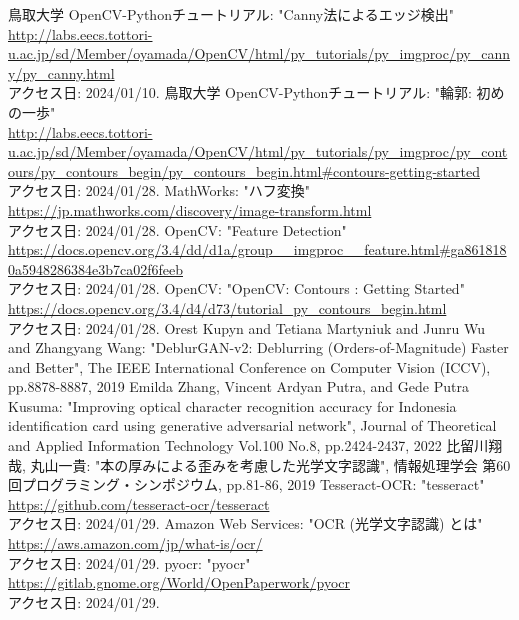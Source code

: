 \documentclass[uplatex, report, a4j, 10pt]{jsbook}
\begin{document}
\begin{thebibliography}{0}
  鳥取大学 OpenCV-Pythonチュートリアル: "Canny法によるエッジ検出"\\\url{http://labs.eecs.tottori-u.ac.jp/sd/Member/oyamada/OpenCV/html/py_tutorials/py_imgproc/py_canny/py_canny.html}\\アクセス日: 2024/01/10.
  鳥取大学 OpenCV-Pythonチュートリアル: "輪郭: 初めの一歩"\\\url{http://labs.eecs.tottori-u.ac.jp/sd/Member/oyamada/OpenCV/html/py_tutorials/py_imgproc/py_contours/py_contours_begin/py_contours_begin.html#contours-getting-started}\\アクセス日: 2024/01/28.
  MathWorks: "ハフ変換"\\\url{https://jp.mathworks.com/discovery/image-transform.html}\\アクセス日: 2024/01/28.
  OpenCV: "Feature Detection"\\\url{https://docs.opencv.org/3.4/dd/d1a/group__imgproc__feature.html#ga8618180a5948286384e3b7ca02f6feeb}\\アクセス日: 2024/01/28.
  OpenCV: "OpenCV: Contours : Getting Started"\\\url{https://docs.opencv.org/3.4/d4/d73/tutorial_py_contours_begin.html}\\アクセス日: 2024/01/28.
  Orest Kupyn and Tetiana Martyniuk and Junru Wu and Zhangyang Wang: "DeblurGAN-v2: Deblurring (Orders-of-Magnitude) Faster and Better", The IEEE International Conference on Computer Vision (ICCV), pp.8878-8887, 2019
  Emilda Zhang,  Vincent Ardyan Putra, and Gede Putra Kusuma: "Improving optical character recognition accuracy for Indonesia identification card using generative adversarial network", Journal of Theoretical and Applied Information Technology Vol.100 No.8, pp.2424-2437, 2022
  比留川翔哉, 丸山一貴: "本の厚みによる歪みを考慮した光学文字認識", 情報処理学会 第60回プログラミング・シンポジウム, pp.81-86, 2019
  Tesseract-OCR: "tesseract"\\\url{https://github.com/tesseract-ocr/tesseract}\\アクセス日: 2024/01/29.
  Amazon Web Services: "OCR (光学文字認識) とは"\\\url{https://aws.amazon.com/jp/what-is/ocr/}\\アクセス日: 2024/01/29.
  pyocr: "pyocr"\\\url{https://gitlab.gnome.org/World/OpenPaperwork/pyocr}\\アクセス日: 2024/01/29.

\end{thebibliography}
\end{document}
